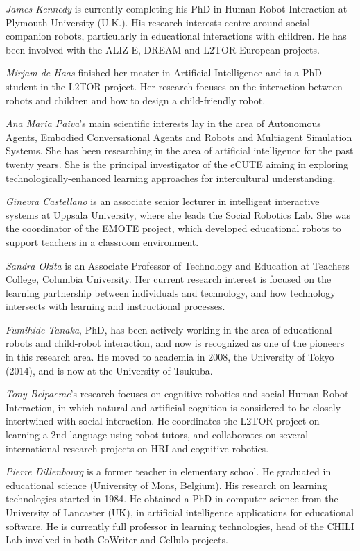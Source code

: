 \documentclass{sig-alternate-05-2015}
\begin{document}
\emph{James Kennedy} is currently completing his PhD in Human-Robot Interaction at Plymouth University (U.K.). His research interests centre around social companion robots, particularly in educational interactions with children. He has been involved with the ALIZ-E, DREAM and L2TOR European projects.

\emph{Mirjam de Haas} finished her master in Artificial Intelligence and is a PhD student in the L2TOR project. Her research focuses on the interaction between robots and children and how to design a child-friendly robot.

\emph{Ana Maria Paiva}'s main scientific interests lay in the area of Autonomous Agents, Embodied Conversational Agents and Robots and Multiagent Simulation Systems. She has been researching in the area of artificial intelligence for the past twenty years. She is the principal investigator of the eCUTE aiming in exploring technologically-enhanced learning approaches for intercultural understanding.

\emph{Ginevra Castellano} is an associate senior lecturer in intelligent interactive systems at Uppsala University, where she leads the Social Robotics Lab. She was the coordinator of the EMOTE project, which developed educational robots to support teachers in a classroom environment.

\emph{Sandra Okita} is an Associate Professor of Technology and Education at Teachers College, Columbia University. Her current research interest is focused on the learning partnership between individuals and technology, and how technology intersects with learning and instructional processes.

\emph{Fumihide Tanaka}, PhD,  has been actively working in the area of educational robots and child-robot interaction, and now is recognized as one of the pioneers in this research area. He moved to academia in 2008, the University of Tokyo (2014), and is now at the University of Tsukuba.

\emph{Tony Belpaeme}'s research focuses on cognitive robotics and social Human-Robot Interaction, in which natural and artificial cognition is considered to be closely intertwined with social interaction. He coordinates the L2TOR project on learning a 2nd language using robot tutors, and collaborates on several international research projects on HRI and cognitive robotics.

\emph{Pierre Dillenbourg} is a former teacher in elementary school. He graduated in educational science (University of Mons, Belgium). His research on learning technologies started in 1984. He obtained a PhD in computer science from the University of Lancaster (UK), in artificial intelligence applications for educational software. He is currently full professor in learning technologies, head of the CHILI Lab involved in both CoWriter and Cellulo projects.
\end{document}

